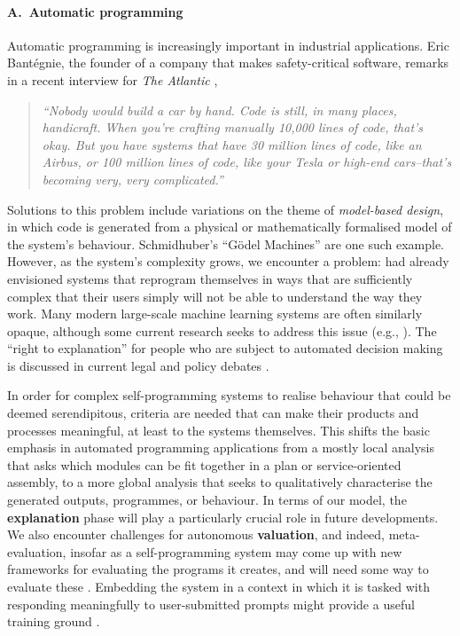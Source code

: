 \paragraph{A.~Automatic programming}
Automatic programming is increasingly important in industrial
applications.  Eric Bant\'egnie, the founder of a company that makes
safety-critical software, remarks in a recent interview for \emph{The
  Atlantic} \cite{saving-the-world-from-code},
\begin{quote}
\emph{``Nobody would build a car by hand.  Code is still, in many
  places, handicraft.  When you're crafting manually 10,000 lines of
  code, that's okay.  But you have systems that have 30 million lines
  of code, like an Airbus, or 100 million lines of code, like your
  Tesla or high-end cars--that's becoming very, very complicated.''}
\end{quote}
Solutions to this problem include variations on the theme of
\emph{model-based design}, in which code is generated from a physical
or mathematically formalised model of the system's behaviour.
Schmidhuber's \cite{schmidhuber2007godel} ``G\"odel Machines'' are one
such example.  However, as the system's complexity grows, we encounter
a problem: \citet{minsky1967programming} had already envisioned
systems that reprogram themselves in ways that are sufficiently
complex that their users simply will not be able to understand the way
they work.  Many modern large-scale machine learning systems are often
similarly opaque, although some current research seeks to address this
issue (e.g., \citet{DBLP:journals/corr/ParkHASDR16}).  The ``right to
explanation'' for people who are subject to automated decision making
is discussed in current legal and policy debates
\cite{wachter2017right}.

In order for complex self-programming systems to realise behaviour
that could be deemed serendipitous, criteria are needed that can make
their products and processes meaningful, at least to the systems
themselves.  This shifts the basic emphasis in automated programming
applications from a mostly local analysis that asks which modules can
be fit together in a plan or service-oriented assembly, to a more
global analysis that seeks to qualitatively characterise the generated
outputs, programmes, or behaviour.  In terms of our model, the
\textbf{explanation} phase will play a particularly crucial role in
future developments.  We also encounter challenges for autonomous
\textbf{valuation}, and indeed, meta-evaluation, insofar as a
self-programming system may come up with new frameworks for evaluating
the programs it creates, and will need some way to evaluate these
\cite{jordanous2014stepping}.  Embedding the system in a context in
which it is tasked with responding meaningfully to
user-submitted prompts might provide a useful training ground
\cite{corneli2016language}.

